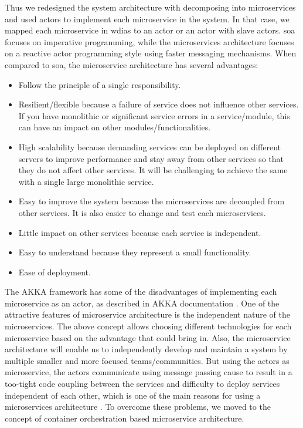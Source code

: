 Thus we redesigned the system architecture with decomposing into microservices and used actors to implement each microservice in the system. In that case, we mapped each microservice in \acrshort{wdias} to an actor or an actor with slave actors. \acrshort{soa} focuses on imperative programming, while the microservices architecture focuses on a reactive actor programming style using faster messaging mechanisms.
When compared to \acrshort{soa}, the microservice architecture has several advantages:
\begin{itemize}
    \item Follow the principle of a single responsibility.
    \item Resilient/flexible because a failure of service does not influence other services. If you have monolithic or significant service errors in a service/module, this can have an impact on other modules/functionalities.
    \item High scalability because demanding services can be deployed on different servers to improve performance and stay away from other services so that they do not affect other services. It will be challenging to achieve the same with a single large monolithic service.
    \item Easy to improve the system because the microservices are decoupled from other services. It is also easier to change and test each microservices.
    \item Little impact on other services because each service is independent.
    \item Easy to understand because they represent a small functionality.
    \item Ease of deployment.
\end{itemize}

The AKKA framework has some of the disadvantages of implementing each microservice as an actor, as described in AKKA documentation \cite{Akka.ioWhenCluster}. One of the attractive features of microservice architecture is the independent nature of the microservices. The above concept allows choosing different technologies for each microservice based on the advantage that could bring in. Also, the microservice architecture will enable us to independently develop and maintain a system by multiple smaller and more focused teams/communities. But using the actors as microservice, the actors communicate using message passing cause to result in a too-tight code coupling between the services and difficulty to deploy services independent of each other, which is one of the main reasons for using a microservices architecture \cite{Akka.ioWhenCluster}. To overcome these problems, we moved to the concept of container orchestration based microservice architecture.

